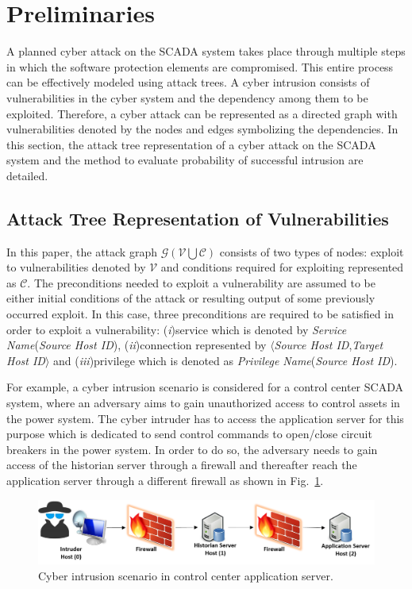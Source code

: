 \section{Preliminaries}\label{sec:prelim}
A planned cyber attack on the SCADA system takes place through multiple steps in which the software protection elements are compromised. This entire process can be effectively modeled using attack trees. A cyber intrusion consists of vulnerabilities in the cyber system and the dependency among them to be exploited. Therefore, a cyber attack can be represented as a directed graph with vulnerabilities denoted by the nodes and edges symbolizing the dependencies. In this section, the attack tree representation of a cyber attack on the SCADA system and the method to evaluate probability of successful intrusion are detailed.
\subsection{Attack Tree Representation of Vulnerabilities}
In this paper, the attack graph $\mathcal{G}(\mathcal{V}\bigcup\mathcal{C})$ consists of two types of nodes: exploit to vulnerabilities denoted by $\mathcal{V}$ and conditions required for exploiting represented as $\mathcal{C}$. The preconditions needed to exploit a vulnerability are assumed to be either initial conditions of the attack or resulting output of some previously occurred exploit. In this case, three preconditions are required to be satisfied in order to exploit a vulnerability: (\textit{i})service which is denoted by \emph{Service Name}(\emph{Source Host ID}), (\textit{ii})connection represented by $\langle$\emph{Source Host ID},\emph{Target Host ID}$\rangle$ and (\textit{iii})privilege which is denoted as \emph{Privilege Name}(\emph{Source Host ID}).

For example, a cyber intrusion scenario is considered for a control center SCADA system, where an adversary aims to gain unauthorized access to control assets in the power system. The cyber intruder has to access the application server for this purpose which is dedicated to send control commands to open/close circuit breakers in the power system. In order to do so, the adversary needs to gain access of the historian server through a firewall and thereafter reach the application server through a different firewall as shown in Fig.~\ref{fig:example}.
\begin{figure}[htbp]
	\centering
	\includegraphics[scale=0.4]{fig-example.png}
	\caption{Cyber intrusion scenario in control center application server.}
	\label{fig:example}
\end{figure}

